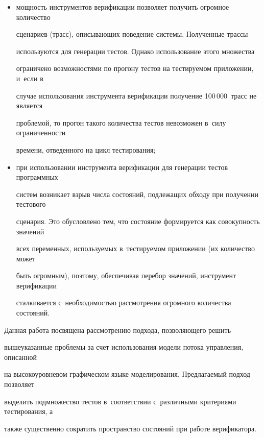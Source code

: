    \begin{itemize}


\item мощность инструментов верификации позволяет получить огромное количество


сценариев (трасс), описывающих поведение системы. Полученные трассы


используются для генерации тестов. Однако использование этого множества


ограничено возможностями по прогону тестов на тестируемом приложении, и~если в


случае использования инструмента верификации получение 100\,000~трасс не является


проблемой, то прогон такого количества тестов невозможен в~силу ограниченности


времени, отведенного на цикл тестирования;


\item при использовании инструмента верификации для генерации тестов программных


систем возникает взрыв числа состояний, подлежащих обходу при получении тестового


сценария. Это обусловлено тем, что состояние формируется как совокупность значений


всех переменных, используемых в~тестируемом приложении (их количество может


быть огромным), поэтому, обеспечивая перебор значений, инструмент верификации


сталкивается с~необходимостью рассмотрения огромного количества состояний.


\end{itemize}





   Данная работа посвящена рассмотрению подхода, позволяющего решить


вышеуказанные проблемы за счет использования модели потока управления, описанной


на высокоуровневом графическом языке моделирования. Предлагаемый подход позволяет


выделить подмножество тестов в~соответствии с~различными критериями тестирования, а


также существенно сократить пространство состояний при работе верификатора.





                  \vspace*{-6pt}





